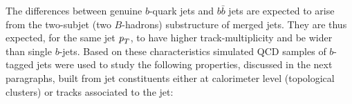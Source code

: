 




The differences between genuine $b$-quark jets and $b \bar{b}$ jets are expected to arise from the two-subjet (two $B$-hadrons) substructure of merged jets.  They are thus expected, for the same jet ${\emph{p}_{T}}$, to have higher track-multiplicity and be wider than single $b$-jets. Based on these characteristics %
simulated QCD samples of $b$-tagged jets were used to study the following properties, discussed in the next paragraphs, built from jet constituents either at calorimeter level (topological clusters) or tracks associated to the jet:

